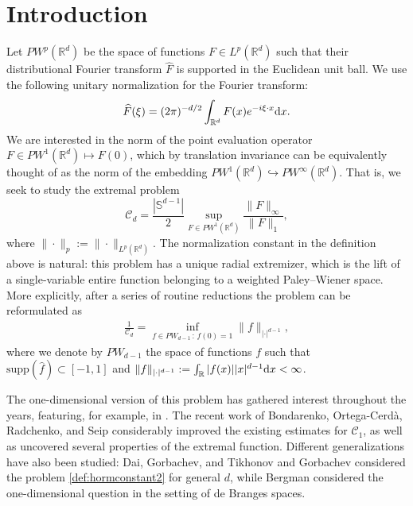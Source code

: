 \documentclass[a4paper,reqno,12pt]{amsart}
\newcommand{\C}{\mathscr{C}}
\renewcommand{\r}{\mathbb{R}}
\newcommand{\ft}{\widehat}
\renewcommand{\d}{{\rm d}}
\renewcommand{\sp}{\mathbb{S}}
\begin{document}
\section{Introduction} 
Let $PW^p(\r^d)$ be the space of functions $F\in L^p(\r^d)$ such that their distributional Fourier transform $\ft F$ is supported in the Euclidean unit ball. We use the following unitary normalization for the Fourier transform:
$$
\ft F(\xi) = (2\pi)^{-d/2} \int_{\r^d} F(x)e^{-i \xi \cdot x}\d x.
$$
We are interested in the norm of the point evaluation operator $F \in PW^1(\r^d) \mapsto F(0)$,
which by translation invariance can be equivalently thought of as the norm of the embedding $PW^1 (\r^d)\hookrightarrow PW^\infty (\r^d) $. That is, we seek to study the extremal problem
\begin{equation*}\label{def:const_def}
\C_d = \frac{|\sp^{d-1}|}{2} \sup_{F \in PW^1(\r^d)} \frac{\|F\|_{\infty}}{\|F\|_{1}},
\end{equation*}
where $\|\cdot\|_p:=\|\cdot\|_{L^p(\r^d)}$.
The normalization constant in the definition above is natural: this problem has a unique radial extremizer, which is the lift of a single-variable entire function belonging to a weighted Paley--Wiener space. More explicitly, after a series of routine reductions the problem can be reformulated as 
\begin{align}\label{def:hormconstant2}
\frac{1}{\C_d}=  \inf_{f\in PW_{d-1} \, : \,  f(0)=1} \|f\|_{|\cdot|^{d-1}},
\end{align}
where we denote by $PW_{d-1}$ the space of functions $f$ such that $\text{supp}(\ft f)\subset [-1,1]$ and $\| f\|_{|\cdot|^{d-1}} := \int_\r |f(x)||x|^{d-1}\d x<\infty$.

The one-dimensional version of this problem has gathered interest throughout the years, featuring, for example, in \cite{AKP,BCOS,CMS,Gor1,HB, LL, Lu}. The recent work of Bondarenko, Ortega-Cerdà, Radchenko, and Seip \cite{BORS1,BORS2} considerably improved the existing estimates for $\C_1$, as well as uncovered several properties of the extremal function. Different generalizations have also been studied: Dai, Gorbachev, and Tikhonov \cite{DGT} and Gorbachev \cite{Gor2} considered the problem \eqref{def:hormconstant2} for general $d$, while Bergman \cite{B} considered the one-dimensional question in the setting of de Branges spaces.
\end{document}
